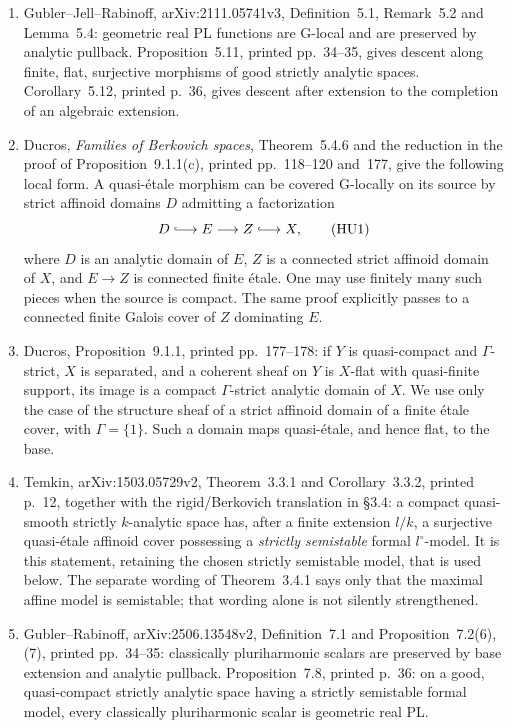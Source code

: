 \begin{enumerate}
\item Gubler--Jell--Rabinoff, arXiv:2111.05741v3, Definition~5.1,
Remark~5.2 and Lemma~5.4: geometric real PL functions are G-local and
are preserved by analytic pullback.  Proposition~5.11, printed
pp.~34--35, gives descent along finite, flat, surjective morphisms of
good strictly analytic spaces.  Corollary~5.12, printed p.~36, gives
descent after extension to the completion of an algebraic extension.
\item Ducros, \emph{Families of Berkovich spaces}, Theorem~5.4.6 and
the reduction in the proof of Proposition~9.1.1(c), printed
pp.~118--120 and~177, give the following local form.  A quasi-\'etale
morphism can be covered G-locally on its source by strict affinoid
domains $D$ admitting a factorization
\[
 D\lhook\joinrel\longrightarrow E\longrightarrow Z
 \lhook\joinrel\longrightarrow X,                         \tag{HU1}
\]
where $D$ is an analytic domain of $E$, $Z$ is a connected strict
affinoid domain of $X$, and $E\to Z$ is connected finite \'etale.
One may use finitely many such pieces when the source is compact.
The same proof explicitly passes to a connected finite Galois cover
of $Z$ dominating $E$.
\item Ducros, Proposition~9.1.1, printed pp.~177--178: if $Y$ is
quasi-compact and $\Gamma$-strict, $X$ is separated, and a coherent
sheaf on $Y$ is $X$-flat with quasi-finite support, its image is a
compact $\Gamma$-strict analytic domain of $X$.  We use only the case
of the structure sheaf of a strict affinoid domain of a finite
\'etale cover, with $\Gamma=\{1\}$.  Such a domain maps
quasi-\'etale, and hence flat, to the base.
\item Temkin, arXiv:1503.05729v2, Theorem~3.3.1 and
Corollary~3.3.2, printed p.~12, together with the rigid/Berkovich
translation in \S3.4: a compact quasi-smooth strictly $k$-analytic
space has, after a finite extension $l/k$, a surjective
quasi-\'etale affinoid cover possessing a \emph{strictly semistable}
formal $l^\circ$-model.  It is this statement, retaining the chosen
strictly semistable model, that is used below.  The separate wording
of Theorem~3.4.1 says only that the maximal affine model is
semistable; that wording alone is not silently strengthened.
\item Gubler--Rabinoff, arXiv:2506.13548v2,
Definition~7.1 and Proposition~7.2(6),(7), printed pp.~34--35:
classically pluriharmonic scalars are preserved by base extension and
analytic pullback.  Proposition~7.8, printed p.~36: on a good,
quasi-compact strictly analytic space having a strictly semistable
formal model, every classically pluriharmonic scalar is geometric
real PL.
\end{enumerate}

